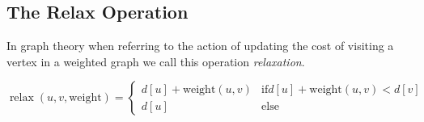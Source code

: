 \subsection{The Relax Operation}

In graph theory when referring to the action of updating the cost of visiting a vertex in a weighted graph we call this operation 
\emph{relaxation}. 

\[
    \operatorname{relax}(u,v, \text{weight}) = 
    \begin{cases}
        d[u] + \text{weight}(u,v) &\text{if} d[u] + \text{weight}(u,v) < d[v] \\ 
        d[u] & \text{else}
    \end{cases}
\]


